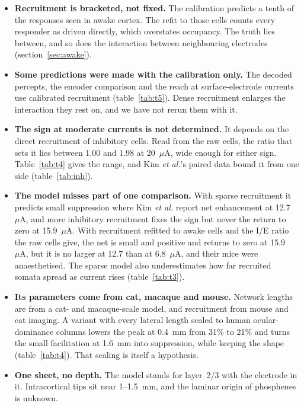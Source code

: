 \documentclass[10pt,twocolumn]{article}
\newcommand{\uA}{\ensuremath{\mu\text{A}}}
\begin{document}
\begin{itemize}[leftmargin=1.1em,itemsep=0.2em,topsep=0.2em]
\item \textbf{Recruitment is bracketed, not fixed.} The calibration
  predicts a tenth of the responses seen in awake cortex. The refit to
  those cells counts every responder as driven directly, which overstates
  occupancy. The truth lies between, and so does the interaction between
  neighbouring electrodes (section~\ref{sec:awake}).
\item \textbf{Some predictions were made with the calibration only.} The
  decoded percepts, the encoder comparison and the reach at
  surface-electrode currents use calibrated recruitment
  (table~\ref{tab:t5}). Dense recruitment enlarges the interaction they rest
  on, and we have not rerun them with it.
\item \textbf{The sign at moderate currents is not determined.} It depends
  on the direct recruitment of inhibitory cells. Read from the raw cells,
  the ratio that sets it lies between 1.00 and 1.98 at 20~\uA, wide
  enough for either sign. Table~\ref{tab:t4} gives the range, and Kim
  \textit{et al.}'s paired data bound it from one side
  (table~\ref{tab:inh}).
\item \textbf{The model misses part of one comparison.} With sparse
  recruitment it predicts small suppression where Kim \textit{et al.}
  report net enhancement at 12.7~\uA, and more inhibitory recruitment fixes
  the sign but never the return to zero at 15.9~\uA. With recruitment
  refitted to awake cells and the I/E ratio the raw cells give, the net is
  small and positive and returns to zero at 15.9~\uA, but it is no larger
  at 12.7 than at 6.8~\uA, and their mice were anaesthetised. The sparse
  model also underestimates how far recruited somata spread as current
  rises (table~\ref{tab:t3}).
\item \textbf{Its parameters come from cat, macaque and mouse.} Network
  lengths are from a cat- and macaque-scale model, and recruitment from
  mouse and cat imaging. A variant with every lateral length scaled to
  human ocular-dominance columns \citep{adams2007} lowers the peak at
  0.4~mm from 31\% to 21\% and turns the small facilitation at 1.6~mm
  into suppression, while keeping the shape (table~\ref{tab:t4}). That
  scaling is itself a hypothesis.
\item \textbf{One sheet, no depth.} The model stands for layer~2/3 with
  the electrode in it. Intracortical tips sit near 1--1.5~mm, and the
  laminar origin of phosphenes is unknown.

\end{itemize}
\end{document}
